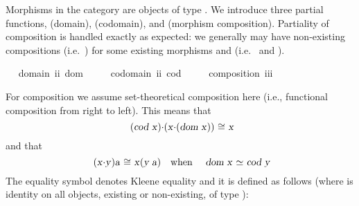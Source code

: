 \begin{isabellebody}
\begin{isamarkuptext}
Morphisms in the category are objects of type . We introduce three partial functions, 
 (domain),  (codomain), and \isa{{\isasymcdot}} (morphism composition). 
Partiality of composition is handled exactly as expected: we generally may have 
non-existing compositions  (i.e.~) for some existing  
morphisms  and  (i.e.~ and ).%
\end{isamarkuptext}\isamarkuptrue%
\isamarkupfalse%
\ \isanewline
\ domain{\isacharcolon}{\isacharcolon}\ {\isachardoublequoteopen}i{\isasymRightarrow}i{\isachardoublequoteclose}\ {\isacharparenleft}{\isachardoublequoteopen}dom\ {\isacharunderscore}{\isachardoublequoteclose}\ {\isacharbrackleft}{}{}{}{\isacharbrackright}\ {}{}{}{\isacharparenright}\ \isanewline
\ codomain{\isacharcolon}{\isacharcolon}\ {\isachardoublequoteopen}i{\isasymRightarrow}i{\isachardoublequoteclose}\ {\isacharparenleft}{\isachardoublequoteopen}cod\ {\isacharunderscore}{\isachardoublequoteclose}\ {\isacharbrackleft}{}{}{}{\isacharbrackright}\ {}{}{}{\isacharparenright}\ \isanewline
\ composition{\isacharcolon}{\isacharcolon}\ {\isachardoublequoteopen}i{\isasymRightarrow}i{\isasymRightarrow}i{\isachardoublequoteclose}\ {\isacharparenleft}\ {\isachardoublequoteopen}{\isasymcdot}{\isachardoublequoteclose}\ {}{}{}{\isacharparenright}%
\begin{isamarkuptext}%
For composition \isa{{\isasymcdot}} we assume set-theoretical composition here (i.e., functional 
composition from right to left). This means that
\[\isa{{\isacharparenleft}cod\ x{\isacharparenright}{\isasymcdot}{\isacharparenleft}x{\isasymcdot}{\isacharparenleft}dom\ x{\isacharparenright}{\isacharparenright}\ {\isasymcong}\ x}\] and that \[\isa{{\isacharparenleft}x{\isasymcdot}y{\isacharparenright}a\ {\isasymcong}\ x{\isacharparenleft}y\ a{\isacharparenright}}\quad \text{when}\quad
\isa{dom\ x\ {\isasymsimeq}\ cod\ y}\] 
The equality symbol \isa{{\isasymcong}} denotes Kleene equality and it
is defined as follows (where \isa{{\isacharequal}} is identity on all objects, existing or non-existing, 
of type ):%
\end{isamarkuptext}\isamarkuptrue%
\isamarkupfalse%

\end{isabellebody}
